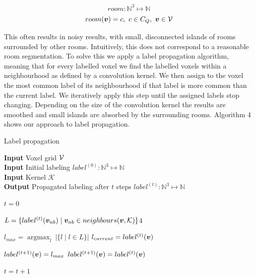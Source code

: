 \begin{equation}
    \label{eq:room_01}
room: \mathbb{N}^{3} \mapsto \mathbb{N}
\end{equation}
\begin{equation}
    \label{eq:room_02}
room(\boldsymbol{v}) = c,\ c \in C_Q,\ \boldsymbol{v} \in \mathcal{V}
\end{equation}

This often results in noisy results, with small, disconnected islands of rooms surrounded by other rooms. Intuitively, this does not correspond to a reasonable room segmentation. To solve this we apply a label propagation algorithm, meaning that for every labelled voxel we find the labelled voxels within a neighbourhood as defined by a convolution kernel. We then assign to the voxel the most common label of its neighbourhood if that label is more common than the current label. We iteratively apply this step until the assigned labels stop changing. Depending on the size of the convolution kernel the results are smoothed and small islands are absorbed by the surrounding rooms. Algorithm 4 shows our approach to label propagation.

\pagebreak

\begin{algorithm}
    \caption{Label propagation}
    \hspace*{\algorithmicindent} \textbf{Input} Voxel grid \(\mathcal{V}\) \\
    \hspace*{\algorithmicindent} \textbf{Input} Initial labeling \(label^{(0)}: \mathbb{N}^{3} \mapsto \mathbb{N}\) \\
    \hspace*{\algorithmicindent} \textbf{Input}  Kernel \(\mathcal{K}\) \\
    \hspace*{\algorithmicindent} \textbf{Output} Propagated labeling after \(t\) steps \(label^{(t)}: \mathbb{N}^{3} \mapsto \mathbb{N}\) \\

    \begin{algorithmic}
    \label{algo:label_prop}
    \State $t=0$

     
        \ForEach{$\voxel \in \voxelgrid$}
            \State $L = \{label^{(t)}(\boldsymbol{v}_{nb}) \mid \boldsymbol{v}_{nb} \in neighbours(\boldsymbol{v}, \mathcal{K})\}$4

            \State $l_{max} = \mathop{argmax}_{l} \ |\{l \mid l \in L\}|$ 
            \State $l_{current} = label^{(t)}(\boldsymbol{v})$  

                \State \(label^{(t+1)}(\boldsymbol{v}) = l_{max}\)
            \Else
                \State \(label^{(t+1)}(\boldsymbol{v}) = label^{(t)}(\boldsymbol{v})\)
            \EndIf
        \EndFor

        \State $t = t+1$ 
    \EndWhile
    \end{algorithmic}
\end{algorithm}

